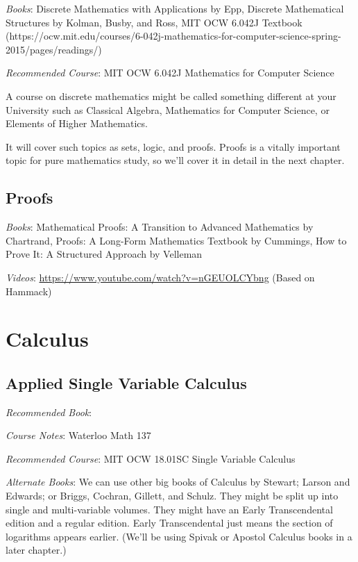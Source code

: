 \documentclass[openany,10pt]{book}
\begin{document}
\textit{Books}: Discrete Mathematics with Applications by Epp, Discrete Mathematical Structures by Kolman, Busby, and Ross, MIT OCW 6.042J Textbook (https://ocw.mit.edu/courses/6-042j-mathematics-for-computer-science-spring-2015/pages/readings/)

\noindent \textit{Recommended Course}: MIT OCW 6.042J Mathematics for Computer Science\newline

\noindent A course on discrete mathematics might be called something different at your University such as Classical Algebra,  Mathematics for Computer Science, or Elements of Higher Mathematics.

It will cover such topics as sets, logic, and proofs.  Proofs is a vitally important topic for pure mathematics study, so we'll cover it in detail in the next chapter.


\chapter{Proofs}

\textit{Books}: Mathematical Proofs: A Transition to Advanced Mathematics by Chartrand, Proofs: A Long-Form Mathematics Textbook by Cummings, How to Prove It: A Structured Approach by Velleman

\textit{Videos}: \url{https://www.youtube.com/watch?v=nGEUOLCYbng} (Based on Hammack)

\part{Calculus}

\chapter{Applied Single Variable Calculus}

\textit{Recommended Book}: \newline

\noindent \textit{Course Notes}: Waterloo Math 137

\noindent \textit{Recommended Course}: MIT OCW 18.01SC Single Variable Calculus\newline

\noindent \textit{Alternate Books}: We can use other big books of Calculus by Stewart; Larson and Edwards; or Briggs, Cochran, Gillett, and Schulz.  They might be split up into single and multi-variable volumes.  They might have an Early Transcendental edition and a regular edition.  Early Transcendental just means the section of logarithms appears earlier.  (We'll be using Spivak or Apostol Calculus books in a later chapter.) 
\end{document}
